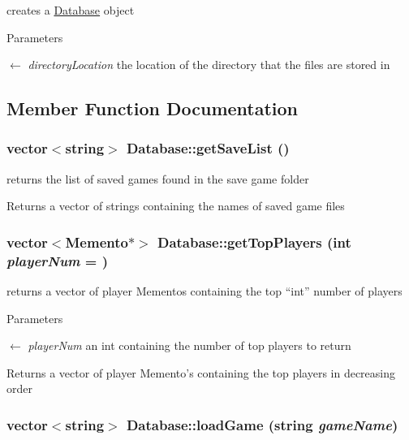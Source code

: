 creates a \hyperlink{classDatabase}{Database} object 
\begin{DoxyParams}{Parameters}
\item[\mbox{$\leftarrow$} {\em directoryLocation}]the location of the directory that the files are stored in \end{DoxyParams}


\subsection{Member Function Documentation}
\hypertarget{classDatabase_af77269e1ad834ae1d9d2e694cc5f6b7b}{
\subsubsection[{getSaveList}]{\setlength{\rightskip}{0pt plus 5cm}vector$<$string$>$ Database::getSaveList ()}}
\label{classDatabase_af77269e1ad834ae1d9d2e694cc5f6b7b}


returns the list of saved games found in the save game folder \begin{DoxyReturn}{Returns}
a vector of strings containing the names of saved game files 
\end{DoxyReturn}
\hypertarget{classDatabase_ae91622236a16acaf9d27ff73940f84f3}{
\subsubsection[{getTopPlayers}]{\setlength{\rightskip}{0pt plus 5cm}vector$<${\bf Memento}$\ast$$>$ Database::getTopPlayers (int {\em playerNum} = {})}}
\label{classDatabase_ae91622236a16acaf9d27ff73940f84f3}
returns a vector of player Mementos containing the top “int” number of players 
\begin{DoxyParams}{Parameters}
\item[\mbox{$\leftarrow$} {\em playerNum}]an int containing the number of top players to return \end{DoxyParams}
\begin{DoxyReturn}{Returns}
a vector of player Memento's containing the top players in decreasing order 
\end{DoxyReturn}
\hypertarget{classDatabase_aefebb94db8894a40bd3fbd691c1d034c}{
\subsubsection[{loadGame}]{\setlength{\rightskip}{0pt plus 5cm}vector$<$string$>$ Database::loadGame (string {\em gameName})}}
\label{classDatabase_aefebb94db8894a40bd3fbd691c1d034c}


